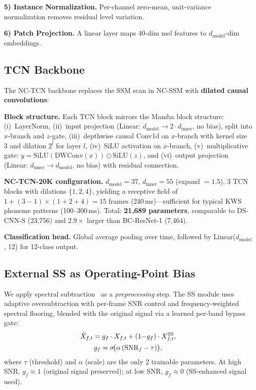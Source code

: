\documentclass[conference]{IEEEtran}
\begin{document}
\textbf{5) Instance Normalization.}
Per-channel zero-mean, unit-variance normalization removes residual level variation.

\textbf{6) Patch Projection.}
A linear layer maps 40-dim mel features to $d_\text{model}$-dim embeddings.

\subsection{TCN Backbone}
\label{sec:tcn}

The NC-TCN backbone replaces the SSM scan in NC-SSM with \textbf{dilated causal convolutions}:

\textbf{Block structure.}
Each TCN block mirrors the Mamba block structure:
(i)~LayerNorm,
(ii)~input projection (Linear: $d_\text{model} \to 2 \cdot d_\text{inner}$, no bias), split into $x$-branch and $z$-gate,
(iii)~depthwise causal Conv1d on $x$-branch with kernel size 3 and dilation $2^l$ for layer $l$,
(iv)~SiLU activation on $x$-branch,
(v)~multiplicative gate: $y = \text{SiLU}(\text{DWConv}(x)) \odot \text{SiLU}(z)$, and
(vi)~output projection (Linear: $d_\text{inner} \to d_\text{model}$, no bias) with residual connection.

\textbf{NC-TCN-20K configuration.}
$d_\text{model}=37$, $d_\text{inner}=55$ (expand $=1.5$), 3 TCN blocks with dilations $\{1, 2, 4\}$, yielding a receptive field of $1 + (3{-}1)\times(1{+}2{+}4) = 15$ frames (240\,ms)---sufficient for typical KWS phoneme patterns (100--300\,ms).
Total: \textbf{21,689 parameters}, comparable to DS-CNN-S (23,756) and $2.9\times$ larger than BC-ResNet-1 (7,464).

\textbf{Classification head.}
Global average pooling over time, followed by Linear($d_\text{model}$, 12) for 12-class output.

\subsection{External SS as Operating-Point Bias}
\label{sec:ss}

We apply spectral subtraction~\cite{boll1979suppression} as a \emph{preprocessing} step.
The SS module uses adaptive oversubtraction with per-frame SNR control and frequency-weighted spectral flooring, blended with the original signal via a learned per-band bypass gate:
\begin{gather}
    \hat{X}_{f,t} = g_f \cdot X_{f,t} + (1{-}g_f) \cdot X^{\text{SS}}_{f,t}, \notag\\
    g_f = \sigma\!\big(\alpha\,(\text{SNR}_f - \tau)\big),
\end{gather}
where $\tau$ (threshold) and $\alpha$ (scale) are the only 2 trainable parameters.
At high SNR, $g_f{\approx}1$ (original signal preserved); at low SNR, $g_f{\approx}0$ (SS-enhanced signal used).
\end{document}
